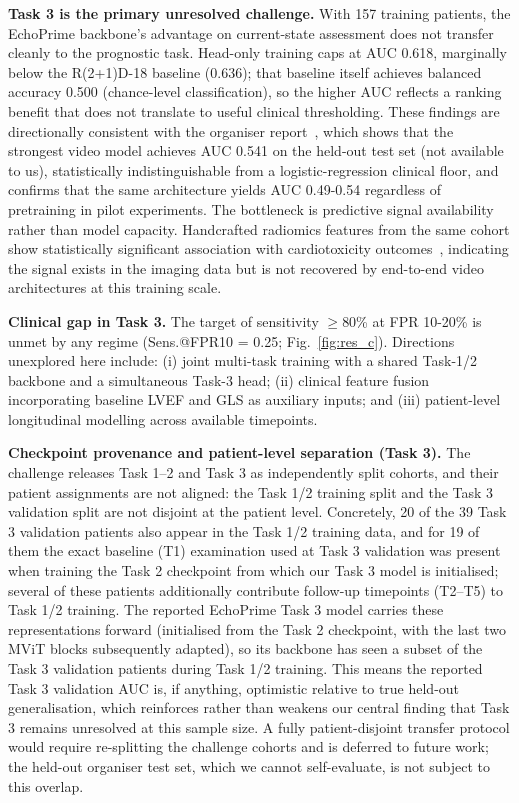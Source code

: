 \documentclass[runningheads]{llncs}
\begin{document}
\noindent\textbf{Task 3 is the primary unresolved challenge.} With 157 training patients, the EchoPrime backbone's advantage on current-state assessment does not transfer cleanly to the prognostic task. Head-only training caps at AUC 0.618, marginally below the R(2+1)D-18 baseline (0.636); that baseline itself achieves balanced accuracy 0.500 (chance-level classification), so the higher AUC reflects a ranking benefit that does not translate to useful clinical thresholding. These findings are directionally consistent with the organiser report~\cite{ref_echorisk}, which shows that the strongest video model achieves AUC 0.541 on the held-out test set (not available to us), statistically indistinguishable from a logistic-regression clinical floor, and confirms that the same architecture yields AUC 0.49-0.54 regardless of pretraining in pilot experiments. The bottleneck is predictive signal availability rather than model capacity. Handcrafted radiomics features from the same cohort show statistically significant association with cardiotoxicity outcomes~\cite{ref_echorisk}, indicating the signal exists in the imaging data but is not recovered by end-to-end video architectures at this training scale.

\noindent\textbf{Clinical gap in Task 3.} The target of sensitivity $\ge$80\% at FPR 10-20\% is unmet by any regime (Sens.@FPR10 = 0.25; Fig.~\ref{fig:res_c}). Directions unexplored here include: (i) joint multi-task training with a shared Task-1/2 backbone and a simultaneous Task-3 head; (ii) clinical feature fusion incorporating baseline LVEF and GLS as auxiliary inputs; and (iii) patient-level longitudinal modelling across available timepoints.

\noindent\textbf{Checkpoint provenance and patient-level separation (Task 3).} The challenge releases Task 1--2 and Task 3 as independently split cohorts, and their patient assignments are not aligned: the Task 1/2 training split and the Task 3 validation split are not disjoint at the patient level. Concretely, 20 of the 39 Task 3 validation patients also appear in the Task 1/2 training data, and for 19 of them the exact baseline (T1) examination used at Task 3 validation was present when training the Task 2 checkpoint from which our Task 3 model is initialised; several of these patients additionally contribute follow-up timepoints (T2--T5) to Task 1/2 training. The reported EchoPrime Task 3 model carries these representations forward (initialised from the Task 2 checkpoint, with the last two MViT blocks subsequently adapted), so its backbone has seen a subset of the Task 3 validation patients during Task 1/2 training. This means the reported Task 3 validation AUC is, if anything, optimistic relative to true held-out generalisation, which reinforces rather than weakens our central finding that Task 3 remains unresolved at this sample size. A fully patient-disjoint transfer protocol would require re-splitting the challenge cohorts and is deferred to future work; the held-out organiser test set, which we cannot self-evaluate, is not subject to this overlap.
\end{document}
